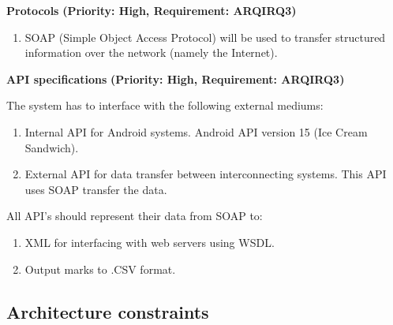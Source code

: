 \documentclass[12pt]{article}
\begin{document}
			\vspace{0.2in}

		\begin{flushleft}
				\textbf{Protocols}
				\newline\textbf{(Priority: High, Requirement: ARQIRQ3)} 
		\end{flushleft}
			
			\vspace{0.05in} 
			
			\begin{enumerate}
				\item SOAP (Simple Object Access Protocol) will be used to transfer 
				structured information over the network (namely the Internet). 
			\end{enumerate}	
			
			\vspace{0.15in}
			
		
\begin{flushleft}
				\textbf{API specifications}
				\newline\textbf{(Priority: High, Requirement: ARQIRQ3)}
\end{flushleft}		
		\vspace{0.05in} 
		
		The system has to interface with the following external mediums:
	\begin{enumerate}
		\item Internal API for Android systems. Android API version 15 (Ice Cream Sandwich). 
		\item External API for data transfer between interconnecting systems. This API uses SOAP 				transfer the data.
	\end{enumerate}
	\vspace{0.05in} 
	
	All API's should represent their data from SOAP to:
	\begin{enumerate}
					\item XML for interfacing with web servers using WSDL.
					\item Output marks to .CSV format.					
	\end{enumerate}
		
		\vspace{0.15in}
			

	
			\vspace{0.2in}			
			
			
		
		\subsection{Architecture constraints}
	
\end{document}
